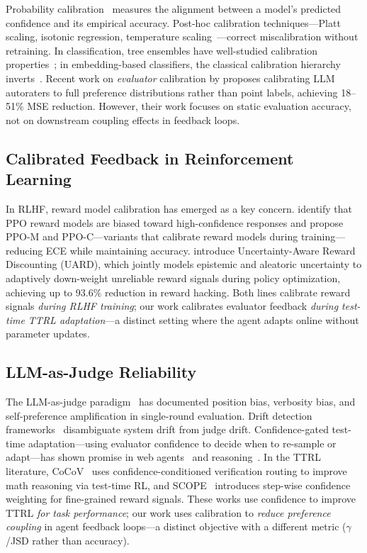 \documentclass[11pt]{article}
\begin{document}
Probability calibration~\cite{guo2017calibration} measures the alignment between a model's predicted confidence and its empirical accuracy. Post-hoc calibration techniques---Platt scaling, isotonic regression, temperature scaling~\cite{niculescu2005predicting}---correct miscalibration without retraining. In classification, tree ensembles have well-studied calibration properties~\cite{bostrom2008calibration}; in embedding-based classifiers, the classical calibration hierarchy inverts~\cite{grinsztajn2022tree}. Recent work on \emph{evaluator} calibration by \citet{li2025judging} proposes calibrating LLM autoraters to full preference distributions rather than point labels, achieving 18--51\% MSE reduction. However, their work focuses on static evaluation accuracy, not on downstream coupling effects in feedback loops.

\subsection{Calibrated Feedback in Reinforcement Learning}

In RLHF, reward model calibration has emerged as a key concern. \citet{leng2024taming} identify that PPO reward models are biased toward high-confidence responses and propose PPO-M and PPO-C---variants that calibrate reward models during training---reducing ECE while maintaining accuracy. \citet{singha2026uard} introduce Uncertainty-Aware Reward Discounting (UARD), which jointly models epistemic and aleatoric uncertainty to adaptively down-weight unreliable reward signals during policy optimization, achieving up to 93.6\% reduction in reward hacking. Both lines calibrate reward signals \emph{during RLHF training}; our work calibrates evaluator feedback \emph{during test-time TTRL adaptation}---a distinct setting where the agent adapts online without parameter updates.

\subsection{LLM-as-Judge Reliability}

The LLM-as-judge paradigm~\cite{zheng2023judging,chiang2024chatbot} has documented position bias, verbosity bias, and self-preference amplification in single-round evaluation. Drift detection frameworks~\cite{li2026drift} disambiguate system drift from judge drift. Confidence-gated test-time adaptation---using evaluator confidence to decide when to re-sample or adapt---has shown promise in web agents~\cite{devarakonda2026confidence} and reasoning~\cite{balashankar2024infalign}. In the TTRL literature, CoCoV~\cite{zuo2026cocov} uses confidence-conditioned verification routing to improve math reasoning via test-time RL, and SCOPE~\cite{wang2026scope} introduces step-wise confidence weighting for fine-grained reward signals. These works use confidence to improve TTRL \emph{for task performance}; our work uses calibration to \emph{reduce preference coupling} in agent feedback loops---a distinct objective with a different metric ($\gamma$/JSD rather than accuracy).
\end{document}
